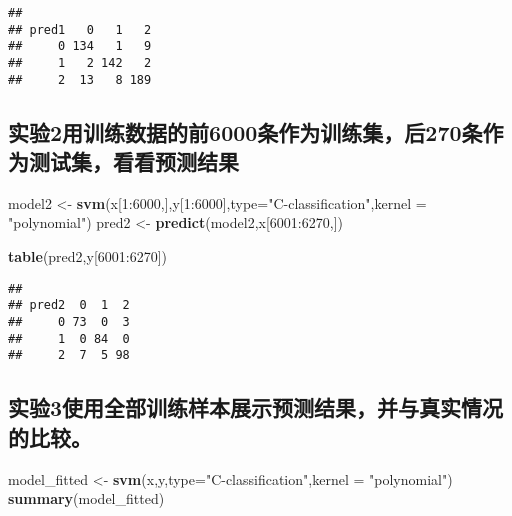 \documentclass[]{article}
\newenvironment{Shaded}{\begin{snugshade}}{\end{snugshade}}
\newcommand{\KeywordTok}[1]{\textcolor[rgb]{0.13,0.29,0.53}{\textbf{{#1}}}}
\newcommand{\DataTypeTok}[1]{\textcolor[rgb]{0.13,0.29,0.53}{{#1}}}
\newcommand{\DecValTok}[1]{\textcolor[rgb]{0.00,0.00,0.81}{{#1}}}
\newcommand{\StringTok}[1]{\textcolor[rgb]{0.31,0.60,0.02}{{#1}}}
\newcommand{\NormalTok}[1]{{#1}}
\begin{document}
\begin{verbatim}
##      
## pred1   0   1   2
##     0 134   1   9
##     1   2 142   2
##     2  13   8 189
\end{verbatim}

\subsection{实验2用训练数据的前6000条作为训练集，后270条作为测试集，看看预测结果}\label{26000270}

\begin{Shaded}
\begin{Highlighting}[]
\NormalTok{model2 <-}\StringTok{ }\KeywordTok{svm}\NormalTok{(x[}\DecValTok{1}\NormalTok{:}\DecValTok{6000}\NormalTok{,],y[}\DecValTok{1}\NormalTok{:}\DecValTok{6000}\NormalTok{],}\DataTypeTok{type=}\StringTok{"C-classification"}\NormalTok{,}\DataTypeTok{kernel =} \StringTok{"polynomial"}\NormalTok{)}
\NormalTok{pred2 <-}\StringTok{ }\KeywordTok{predict}\NormalTok{(model2,x[}\DecValTok{6001}\NormalTok{:}\DecValTok{6270}\NormalTok{,])}
\end{Highlighting}
\end{Shaded}

\begin{Shaded}
\begin{Highlighting}[]
\KeywordTok{table}\NormalTok{(pred2,y[}\DecValTok{6001}\NormalTok{:}\DecValTok{6270}\NormalTok{])}
\end{Highlighting}
\end{Shaded}

\begin{verbatim}
##      
## pred2  0  1  2
##     0 73  0  3
##     1  0 84  0
##     2  7  5 98
\end{verbatim}

\subsection{实验3使用全部训练样本展示预测结果，并与真实情况的比较。}\label{3}

\begin{Shaded}
\begin{Highlighting}[]
\NormalTok{model_fitted <-}\StringTok{ }\KeywordTok{svm}\NormalTok{(x,y,}\DataTypeTok{type=}\StringTok{"C-classification"}\NormalTok{,}\DataTypeTok{kernel =} \StringTok{"polynomial"}\NormalTok{)}
\KeywordTok{summary}\NormalTok{(model_fitted)}
\end{Highlighting}
\end{Shaded}
\end{document}
